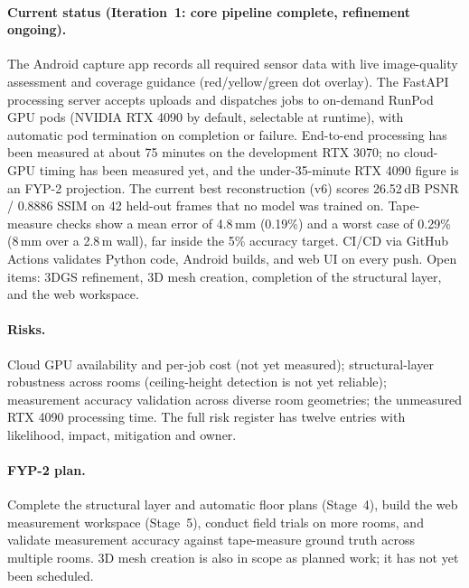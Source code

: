 \paragraph{Current status (Iteration~1: core pipeline complete, refinement ongoing).} The Android capture app records all required sensor data with live image-quality assessment and coverage guidance (red/yellow/green dot overlay). The FastAPI processing server accepts uploads and dispatches jobs to on-demand RunPod GPU pods (NVIDIA RTX 4090 by default, selectable at runtime), with automatic pod termination on completion or failure. End-to-end processing has been measured at about 75 minutes on the development RTX 3070; no cloud-GPU timing has been measured yet, and the under-35-minute RTX 4090 figure is an FYP-2 projection. The current best reconstruction (v6) scores 26.52\,dB PSNR / 0.8886 SSIM on 42 held-out frames that no model was trained on. Tape-measure checks show a mean error of 4.8\,mm (0.19\%) and a worst case of 0.29\% (8\,mm over a 2.8\,m wall), far inside the 5\% accuracy target. CI/CD via GitHub Actions validates Python code, Android builds, and web UI on every push. Open items: 3DGS refinement, 3D mesh creation, completion of the structural layer, and the web workspace.

\paragraph{Risks.} Cloud GPU availability and per-job cost (not yet measured); structural-layer robustness across rooms (ceiling-height detection is not yet reliable); measurement accuracy validation across diverse room geometries; the unmeasured RTX 4090 processing time. The full risk register has twelve entries with likelihood, impact, mitigation and owner.

\paragraph{FYP-2 plan.} Complete the structural layer and automatic floor plans (Stage~4), build the web measurement workspace (Stage~5), conduct field trials on more rooms, and validate measurement accuracy against tape-measure ground truth across multiple rooms. 3D mesh creation is also in scope as planned work; it has not yet been scheduled.
